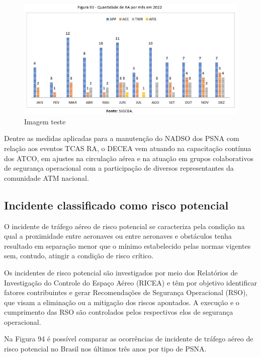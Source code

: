 \documentclass[
]{book}
\begin{document}
\begin{figure}
\centering
\includegraphics{imagens/fig80.jpg}
\caption{Imagem teste}
\end{figure}

Dentre as medidas aplicadas para a manutenção do NADSO dos PSNA com relação aos eventos TCAS RA, o DECEA vem atuando na capacitação contínua dos ATCO, em ajustes na circulação aérea e na atuação em grupos colaborativos de segurança operacional com a participação de diversos representantes da comunidade ATM nacional.

\hypertarget{incidente-classificado-como-risco-potencial}{%
\subsection{Incidente classificado como risco potencial}\label{incidente-classificado-como-risco-potencial}}

O incidente de tráfego aéreo de risco potencial se caracteriza pela condição na qual a proximidade entre aeronaves ou entre aeronaves e obstáculos tenha resultado em separação menor que o mínimo estabelecido pelas normas vigentes sem, contudo, atingir a condição de risco crítico.

Os incidentes de risco potencial são investigados por meio dos Relatórios de Investigação do Controle do Espaço Aéreo (RICEA) e têm por objetivo identificar fatores contribuintes e gerar Recomendações de Segurança Operacional (RSO), que visam a eliminação ou a mitigação dos riscos apontados. A execução e o cumprimento das RSO são controlados pelos respectivos elos de segurança operacional.

Na Figura 94 é possível comparar as ocorrências de incidente de tráfego aéreo de risco potencial no Brasil nos últimos três anos por tipo de PSNA.
\end{document}
